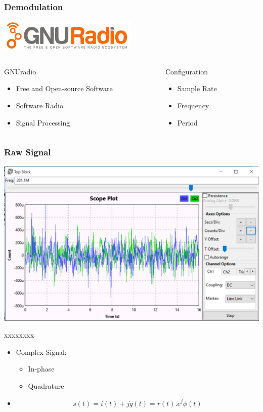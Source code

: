 
\begin{frame}
	\frametitle{Demodulation}
	\centering \includegraphics[scale=.13]{images/gnuradio_logo.png}

	\begin{columns}[c] %
		\begin{column}{.28\textwidth}
			\begin{block}{GNUradio}
				\begin{itemize}
					\item Free and Open-source Software
					\item Software Radio
					\item Signal Processing
				\end{itemize}
			\end{block}
		\end{column}%
		\hfill%
		\begin{column}{.5\textwidth}
			\begin{block}{Configuration}
				\begin{itemize}
					\item Sample Rate 
					\item Frequency
					\item Period
				\end{itemize}
			\end{block}
		\end{column}%
	\end{columns}
\end{frame}

\begin{frame}
	\frametitle{Raw Signal}
	\centering \includegraphics[scale=.2]{images/raw_sig.png}
	\begin{block}{xxxxxxxx}
		\begin{itemize}
			\item Complex Signal:
			\begin{itemize}
				\item In-phase 
				\item Quadrature
			\end{itemize}
			\item \[s(t)=i(t)+jq(t)=r(t).e^j\phi(t) \]
		\end{itemize}
	\end{block}
\end{frame}


